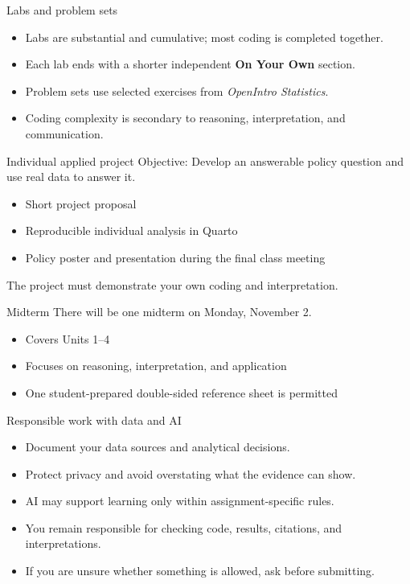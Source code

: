 \documentclass[11pt,aspectratio=169]{beamer}
\begin{document}
\begin{frame}{Labs and problem sets}
\begin{itemize}
  \item Labs are substantial and cumulative; most coding is completed together.
  \item Each lab ends with a shorter independent \textbf{On Your Own} section.
  \item Problem sets use selected exercises from \textit{OpenIntro Statistics}.
  \item Coding complexity is secondary to reasoning, interpretation, and communication.
\end{itemize}
\end{frame}

\begin{frame}{Individual applied project}
\alert{Objective:} Develop an answerable policy question and use real data to answer it.
\begin{itemize}
  \item Short project proposal
  \item Reproducible individual analysis in Quarto
  \item Policy poster and presentation during the final class meeting
\end{itemize}
The project must demonstrate your own coding and interpretation.
\end{frame}

\begin{frame}{Midterm}
There will be one midterm on Monday, November 2.
\begin{itemize}
  \item Covers Units 1--4
  \item Focuses on reasoning, interpretation, and application
  \item One student-prepared double-sided reference sheet is permitted
\end{itemize}
\end{frame}

\begin{frame}{Responsible work with data and AI}
\begin{itemize}
  \item Document your data sources and analytical decisions.
  \item Protect privacy and avoid overstating what the evidence can show.
  \item AI may support learning only within assignment-specific rules.
  \item You remain responsible for checking code, results, citations, and interpretations.
  \item If you are unsure whether something is allowed, ask before submitting.
\end{itemize}
\end{frame}
\end{document}
